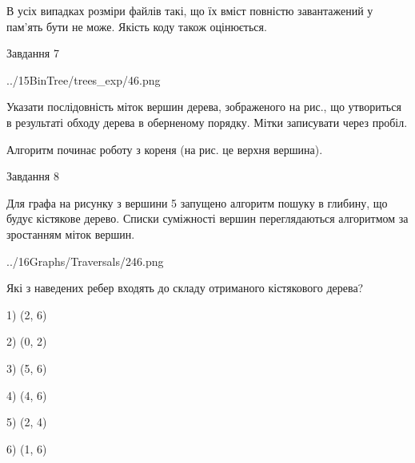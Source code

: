 \documentclass[12pt, ukrainian]{article}
\begin{document}
{В усіх випадках розміри файлів такі, що їх вміст повністю завантажений у пам'ять бути не може. Якість коду також оцінюється.



\vspace{10mm}\par

\newpage
\begin{minipage}[t]{9.7cm}
               
{\begin{center}Завдання {7}\end{center}}
\vspace{-4mm}

\begin{center}
	{../15BinTree/trees_exp/46.png}
\end{center}
Указати послідовність міток вершин дерева, зображеного на рис., що утвориться в результаті обходу дерева в оберненому порядку. Мітки записувати через пробіл.\par Алгоритм починає роботу з кореня (на рис. це верхня вершина).\par

\end{minipage}
\vline \hspace{8mm}
\begin{minipage}[t]{8.0cm}
               
{\begin{center}Завдання {8}\end{center}}
\vspace{-4mm}
Для графа на рисунку з вершини 5 запущено алгоритм пошуку в глибину, що будує кістякове дерево. Списки суміжності вершин переглядаються алгоритмом за зростанням міток вершин.\par
\begin{center}
	{../16Graphs/Traversals/246.png}
\end{center}
\par Які з наведених ребер входять до складу отриманого кістякового дерева?\par
1) (2, 6)\par
2) (0, 2)\par
3) (5, 6)\par
4) (4, 6)\par
5) (2, 4)\par
6) (1, 6)\par
{\vskip 15pt} \par


\end{minipage}}
\end{document}
